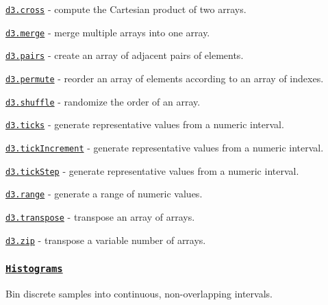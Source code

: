 \begin{DoxyItemize}
\item \href{https://github.com/d3/d3-array/blob/master/README.md#cross}{\tt d3.\+cross} -\/ compute the Cartesian product of two arrays.
\item \href{https://github.com/d3/d3-array/blob/master/README.md#merge}{\tt d3.\+merge} -\/ merge multiple arrays into one array.
\item \href{https://github.com/d3/d3-array/blob/master/README.md#pairs}{\tt d3.\+pairs} -\/ create an array of adjacent pairs of elements.
\item \href{https://github.com/d3/d3-array/blob/master/README.md#permute}{\tt d3.\+permute} -\/ reorder an array of elements according to an array of indexes.
\item \href{https://github.com/d3/d3-array/blob/master/README.md#shuffle}{\tt d3.\+shuffle} -\/ randomize the order of an array.
\item \href{https://github.com/d3/d3-array/blob/master/README.md#ticks}{\tt d3.\+ticks} -\/ generate representative values from a numeric interval.
\item \href{https://github.com/d3/d3-array/blob/master/README.md#tickIncrement}{\tt d3.\+tick\+Increment} -\/ generate representative values from a numeric interval.
\item \href{https://github.com/d3/d3-array/blob/master/README.md#tickStep}{\tt d3.\+tick\+Step} -\/ generate representative values from a numeric interval.
\item \href{https://github.com/d3/d3-array/blob/master/README.md#range}{\tt d3.\+range} -\/ generate a range of numeric values.
\item \href{https://github.com/d3/d3-array/blob/master/README.md#transpose}{\tt d3.\+transpose} -\/ transpose an array of arrays.
\item \href{https://github.com/d3/d3-array/blob/master/README.md#zip}{\tt d3.\+zip} -\/ transpose a variable number of arrays.
\end{DoxyItemize}

\subsubsection*{\href{https://github.com/d3/d3-array/blob/master/README.md#histograms}{\tt Histograms}}

Bin discrete samples into continuous, non-\/overlapping intervals.


